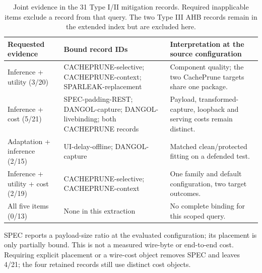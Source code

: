 \begin{table}[t]\centering\footnotesize
\caption{Joint evidence in the 31 Type I/II mitigation records. Required inapplicable items exclude a record from that query. The two Type III AHB records remain in the extended index but are excluded here.}\label{tab:r35-positive}
\begin{tabularx}{\textwidth}{@{}p{}p{}Y@{}}\toprule
Requested evidence & Bound record IDs & Interpretation at the source configuration\\\midrule
Inference + utility (3/20) & CACHEPRUNE-selective; CACHEPRUNE-context; SPARLEAK-replacement & Component quality; the two CachePrune targets share one package.\\
Inference + cost (5/21) & SPEC-padding-REST; DANGOL-capture; DANGOL-livebinding; both CACHEPRUNE records & Payload, transformed-capture, loopback and serving costs remain distinct.\\
Adaptation + inference (2/15) & UI-delay-offline; DANGOL-capture & Matched clean/protected fitting on a defended test.\\
Inference + utility + cost (2/19) & CACHEPRUNE-selective; CACHEPRUNE-context & One family and default configuration, two target outcomes.\\
All five items (0/13) & None in this extraction & No complete binding for this scoped query.\\\bottomrule
\end{tabularx}
\par\smallskip\raggedright SPEC reports a payload-size ratio at the evaluated configuration; its placement is only partially bound. This is not a measured wire-byte or end-to-end cost. Requiring explicit placement or a wire-cost object removes SPEC and leaves 4/21; the four retained records still use distinct cost objects.\end{table}
